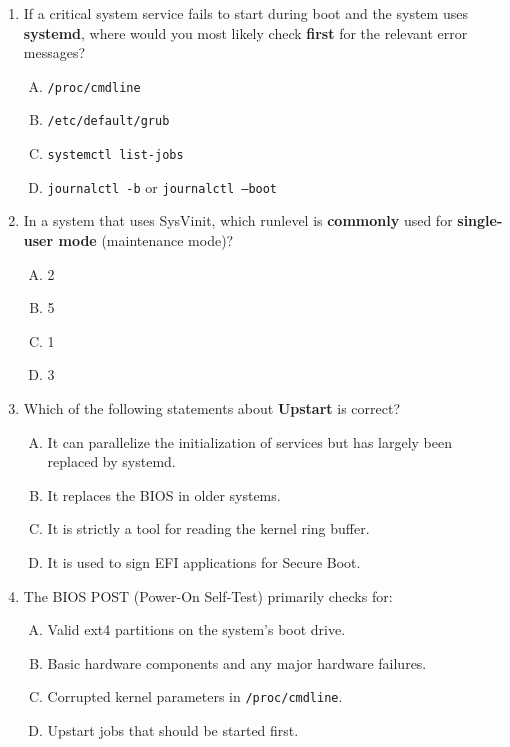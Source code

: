 \documentclass[a4paper]{report}
\begin{document}
\begin{enumerate}[1.]
    \item If a critical system service fails to start during boot and the system uses \textbf{systemd}, where would you most likely check \textbf{first} for the relevant error messages?
      \begin{enumerate}[A)]
        \item \texttt{/proc/cmdline}
        \item \texttt{/etc/default/grub}
        \item \texttt{systemctl list-jobs}
        \item \texttt{journalctl -b} or \texttt{journalctl --boot}
      \end{enumerate}
    
    \item In a system that uses SysVinit, which runlevel is \textbf{commonly} used for \textbf{single-user mode} (maintenance mode)?
      \begin{enumerate}[A)]
        \item 2
        \item 5
        \item 1
        \item 3
      \end{enumerate}
    
    \item Which of the following statements about \textbf{Upstart} is correct?
      \begin{enumerate}[A)]
        \item It can parallelize the initialization of services but has largely been replaced by systemd.
        \item It replaces the BIOS in older systems.
        \item It is strictly a tool for reading the kernel ring buffer.
        \item It is used to sign EFI applications for Secure Boot.
      \end{enumerate}
    
    \item The BIOS POST (Power-On Self-Test) primarily checks for:
      \begin{enumerate}[A)]
        \item Valid ext4 partitions on the system’s boot drive.
        \item Basic hardware components and any major hardware failures.
        \item Corrupted kernel parameters in \texttt{/proc/cmdline}.
        \item Upstart jobs that should be started first.
      \end{enumerate}
    
    \end{enumerate}
\end{document}
